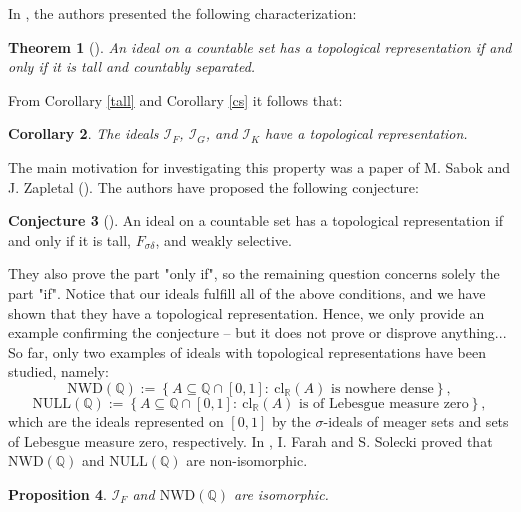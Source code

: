 \documentclass{amsart}
\newtheorem{thm}{Theorem}[section]
\newtheorem{prop}[thm]{Proposition}
\newtheorem{cor}[thm]{Corollary}
\theoremstyle{definition}
\newtheorem{conj}[thm]{Conjecture}
\newcommand{\R}{{\mathbb R}}
\newcommand{\Q}{{\mathbb Q}}
\newcommand{\I}{\mathcal I}
\newcommand{\NULL}{\mathrm{NULL}}
\newcommand{\NWD}{\mathrm{NWD}}
\newcommand{\cl}{\mathrm{cl}}
\begin{document}
In \cite{Adas}, the authors presented the following characterization: 

\begin{thm}[{\cite[Theorem 1.1]{Adas}}]
An ideal on a countable set has a topological representation if and only if it is tall and countably separated.
\end{thm}

From Corollary \ref{tall} and Corollary \ref{cs} it follows that:

\begin{cor}
The ideals $\I_F$, $\I_G$, and $\I_K$ have a topological representation.
\end{cor}

The main motivation for investigating this property was a paper of M. Sabok and J. Zapletal (\cite{Sabok}). The authors have proposed the following conjecture:

\begin{conj}[\cite{Sabok}]
An ideal on a countable set has a topological representation if and only if it is tall, $F_{\sigma\delta}$, and weakly selective. 
\end{conj}

They also prove the part "only if", so the remaining question concerns solely the part "if".
Notice that our ideals fulfill all of the above conditions, and we have shown that they have a topological representation. Hence, we only provide an example confirming the conjecture -- but it does not prove or disprove anything...\\


So far, only two examples of ideals with topological representations have been studied, namely:
$$\NWD(\Q):=\left\{A\subseteq\mathbb{Q}\cap [0,1] :\ \cl_\R(A) \textrm{ is nowhere dense}\right\},$$
$$\NULL(\Q):=\left\{A\subseteq\mathbb{Q}\cap [0,1] :\ \cl_\R(A) \textrm{ is of Lebesgue measure zero}\right\},$$
which are the ideals represented on $[0,1]$ by the $\sigma$-ideals of meager sets and sets of Lebesgue measure zero, respectively. In \cite{FS}, I. Farah and S. Solecki proved that $\NWD(\Q)$ and $\NULL(\Q)$ are non-isomorphic.

\begin{prop}
$\I_F$ and $\NWD(\Q)$ are isomorphic.
\end{prop}
\end{document}
